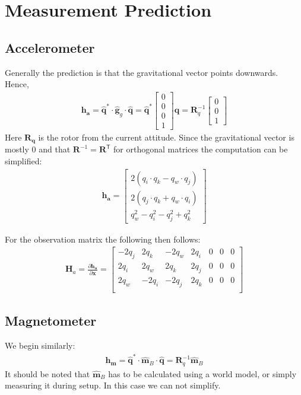 \documentclass[10pt,a4paper]{article}
\newcommand{\M}[1]{\mathbf{#1}}
\newcommand{\V}[1]{\mathbf{#1}}
\newcommand{\Vh}[1]{\mathbf{\hat{#1}}}
\begin{document}
\section{Measurement Prediction}

\subsection{Accelerometer}
Generally the prediction is that the gravitational vector points downwards.
Hence,
\begin{align}
  \V {h_a} = \Vh q^* \cdot \Vh g_g \cdot \Vh q = \Vh q^*
  \begin{bmatrix}
    0 \\ 0 \\ 0 \\ 1
  \end{bmatrix} \Vh q = \M R_q^{-1 }
  \begin{bmatrix}
    0 \\ 0 \\ 1
  \end{bmatrix}
\end{align}
Here $\M {R_q}$ is the rotor from the current attitude.
Since the gravitational vector is mostly 0 and that $\M R^{-1} = \M R^{\mathsf {T}}$ for orthogonal matrices the computation can be simplified:
\begin{align}
  \V {h_a} = \begin{bmatrix}
    2 (q_i \cdot q_k - q_w \cdot q_j) \\
    2 (q_j \cdot q_k + q_w \cdot q_i) \\
    q_w^2 - q_i^2 - q_j^2 + q_k^2
  \end{bmatrix}
\end{align}

For the observation matrix the following then follows:
\begin{align}
  \M H_a =  \frac { \partial \V {h_a}}  {\partial \V x}  =
  \begin{bmatrix}
    - 2 q_j & 2 q_k & - 2 q_w & 2 q_i & 0 & 0 & 0 \\
    2 q_i & 2 q_w &  2 q_k & 2 q_j & 0 & 0 & 0 \\
    2 q_w & - 2 q_i & - 2 q_j & 2 q_k & 0 & 0 & 0 \\
  \end{bmatrix}
\end{align}
\subsection{Magnetometer}
We begin similarly:
\begin{align}
  \V {h_m} = \Vh q^* \cdot \Vh m_B \cdot \Vh q = \M R_q^{-1 } \Vh m_B
\end{align}
It should be noted that $\Vh m_B$ has to be calculated using a world model, or simply measuring it during setup. 
In this case we can not simplify. 
\end{document}
